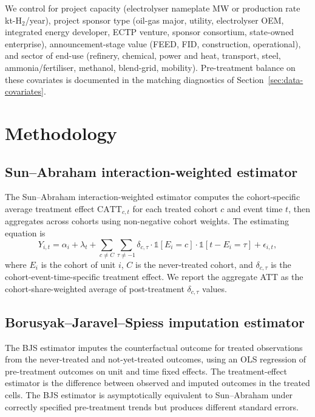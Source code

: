 \documentclass[12pt,a4paper]{article}
\theoremstyle{plain}
\theoremstyle{definition}
\begin{document}
We control for project capacity (electrolyser nameplate MW or production rate kt-H$_2$/year), project sponsor type (oil-gas major, utility, electrolyser OEM, integrated energy developer, ECTP venture, sponsor consortium, state-owned enterprise), announcement-stage value (FEED, FID, construction, operational), and sector of end-use (refinery, chemical, power and heat, transport, steel, ammonia/fertiliser, methanol, blend-grid, mobility). Pre-treatment balance on these covariates is documented in the matching diagnostics of Section~\ref{sec:data-covariates}.

\section{Methodology}
\label{sec:methodology}

\subsection{Sun--Abraham interaction-weighted estimator}
\label{sec:method-sa}

The Sun--Abraham interaction-weighted estimator computes the cohort-specific average treatment effect $\text{CATT}_{c, t}$ for each treated cohort $c$ and event time $t$, then aggregates across cohorts using non-negative cohort weights. The estimating equation is
\begin{equation}
Y_{i, t} = \alpha_i + \lambda_t + \sum_{c \neq C} \sum_{\tau \neq -1} \delta_{c, \tau} \cdot \mathbb{1}[E_i = c] \cdot \mathbb{1}[t - E_i = \tau] + \epsilon_{i, t},
\label{eq:sun-abraham}
\end{equation}
where $E_i$ is the cohort of unit $i$, $C$ is the never-treated cohort, and $\delta_{c, \tau}$ is the cohort-event-time-specific treatment effect. We report the aggregate ATT as the cohort-share-weighted average of post-treatment $\delta_{c, \tau}$ values.

\subsection{Borusyak--Jaravel--Spiess imputation estimator}
\label{sec:method-bjs}

The BJS estimator imputes the counterfactual outcome for treated observations from the never-treated and not-yet-treated outcomes, using an OLS regression of pre-treatment outcomes on unit and time fixed effects. The treatment-effect estimator is the difference between observed and imputed outcomes in the treated cells. The BJS estimator is asymptotically equivalent to Sun--Abraham under correctly specified pre-treatment trends but produces different standard errors.
\end{document}
